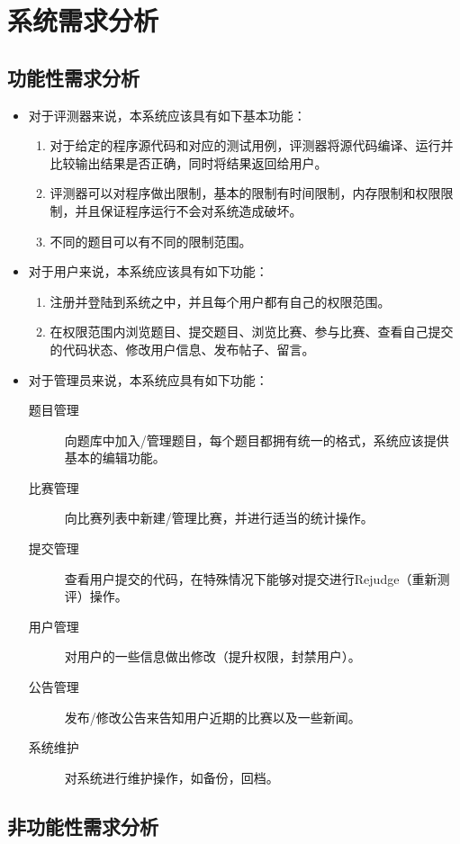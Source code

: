 
\chapter{系统需求分析}
\section{功能性需求分析}
\begin{itemize}
\item 对于评测器来说，本系统应该具有如下基本功能：
\begin{enumerate}
	\item 对于给定的程序源代码和对应的测试用例，评测器将源代码编译、运行并比较输出结果是否正确，同时将结果返回给用户。
	\item 评测器可以对程序做出限制，基本的限制有时间限制，内存限制和权限限制，并且保证程序运行不会对系统造成破坏。
	\item 不同的题目可以有不同的限制范围。
\end{enumerate}
\item 对于用户来说，本系统应该具有如下功能：
\begin{enumerate}
	\item 注册并登陆到系统之中，并且每个用户都有自己的权限范围。
	\item 在权限范围内浏览题目、提交题目、浏览比赛、参与比赛、查看自己提交的代码状态、修改用户信息、发布帖子、留言。
\end{enumerate}
\item 对于管理员来说，本系统应具有如下功能：
\begin{description}
	\item[题目管理] 向题库中加入/管理题目，每个题目都拥有统一的格式，系统应该提供基本的编辑功能。
	\item[比赛管理] 向比赛列表中新建/管理比赛，并进行适当的统计操作。
	\item[提交管理] 查看用户提交的代码，在特殊情况下能够对提交进行Rejudge（重新测评）操作。
	\item[用户管理] 对用户的一些信息做出修改（提升权限，封禁用户）。
	\item[公告管理] 发布/修改公告来告知用户近期的比赛以及一些新闻。
	\item[系统维护] 对系统进行维护操作，如备份，回档。
\end{description}
\end{itemize}


\section{非功能性需求分析}
